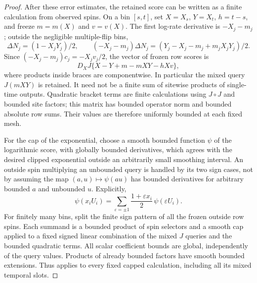 \begin{proof}
After these error estimates, the retained score can be written as a
finite calculation from observed spins.  On a bin $[s,t]$, set
$X=X_s$, $Y=X_t$, $h=t-s$, and freeze $m=m(X)$ and $v=v(X)$.
The first log-rate derivative is $-X_j-m_j$; outside the negligible
multiple-flip bins,
\[
 \Delta N_j=(1-X_jY_j)/2,
 \qquad
 (-X_j-m_j)\Delta N_j
   =(Y_j-X_j-m_j+m_jX_jY_j)/2.
\]
Since $(-X_j-m_j)c_j=-X_jv_j/2$, the vector of frozen row scores is
\begin{equation}
 D_XJ\{X-Y+m-mXY-hXv\},
 \label{eq:path-frozen-score}
\end{equation}
where products inside braces are componentwise.  In particular the
mixed query $J(mXY)$ is retained.  It need not be a finite sum of
sitewise products of single-time outputs.  Quadratic bracket terms
are finite calculations using $J\circ J$ and bounded site factors;
this matrix has bounded operator norm and bounded absolute row sums.
Their values are therefore uniformly bounded at each fixed mesh.

For the cap of the exponential, choose a smooth bounded function
$\psi$ of the logarithmic score, with globally bounded derivatives,
which agrees with the desired clipped exponential outside an arbitrarily
small smoothing interval.  An outside spin multiplying an unbounded
query is handled by its two sign cases, not by assuming the map
$(a,u)\mapsto\psi(au)$ has bounded derivatives for arbitrary bounded
$a$ and unbounded $u$.  Explicitly,
\begin{equation}
 \psi(x_iU_i)=\sum_{\varepsilon=\pm1}
       \frac{1+\varepsilon x_i}{2}\,\psi(\varepsilon U_i).
 \label{eq:path-score-signs}
\end{equation}
For finitely many bins, split the finite sign pattern of all the frozen
outside row spins.  Each summand is a bounded product of spin selectors
and a smooth cap applied to a fixed signed linear combination of the
mixed $J$ queries and the bounded quadratic terms.  All scalar
coefficient bounds are global, independently of the query values.
Products of already bounded factors have smooth bounded extensions.
Thus  applies to every fixed capped
calculation, including all its mixed temporal slots.


\end{proof}
